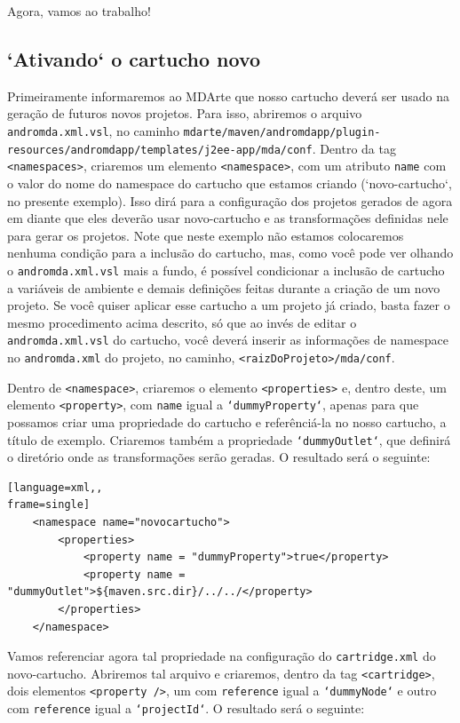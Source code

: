 Agora, vamos ao trabalho!

\subsection{`Ativando` o cartucho novo}
Primeiramente informaremos ao MDArte que nosso cartucho deverá ser usado na
geração de futuros novos projetos. Para isso, abriremos o arquivo
\texttt{andromda.xml.vsl}, no caminho
\texttt{mdarte/maven/andromdapp/plugin-resources/andromdapp/templates/j2ee-app/mda/conf}.
Dentro da tag \texttt{<namespaces>}, criaremos um elemento \texttt{<namespace>},
com um atributo \texttt{name} com o valor do nome do namespace do cartucho que
estamos criando (`novo-cartucho`, no presente exemplo). Isso dirá para a
configuração dos projetos gerados de agora em diante que eles deverão usar
novo-cartucho e as transformações definidas nele para gerar os projetos. Note
que neste exemplo não estamos colocaremos nenhuma condição para a inclusão do
cartucho, mas, como você pode ver olhando o \texttt{andromda.xml.vsl} mais a
fundo, é possível condicionar a inclusão de cartucho a variáveis de ambiente e
demais definições feitas durante a criação de um novo projeto. Se você quiser
aplicar esse cartucho a um projeto já criado, basta fazer o mesmo procedimento
acima descrito, só que ao invés de editar o \texttt{andromda.xml.vsl} do
cartucho, você deverá inserir as informações de namespace no
\texttt{andromda.xml} do projeto, no caminho, \texttt{<raizDoProjeto>/mda/conf}.

Dentro de \texttt{<namespace>}, criaremos o elemento \texttt{<properties>} e,
dentro deste, um elemento \texttt{<property>}, com \texttt{name} igual a
\texttt{`dummyProperty`}, apenas para que possamos criar uma propriedade do
cartucho e referênciá-la no nosso cartucho, a título de exemplo. Criaremos
também a propriedade \texttt{`dummyOutlet`}, que definirá o diretório onde as
transformações serão geradas. O resultado será o seguinte:

 \begin{lstlisting}[language=xml,,
frame=single]
	<namespace name="novocartucho">
	    <properties>
	        <property name = "dummyProperty">true</property>
	        <property name = "dummyOutlet">${maven.src.dir}/../../</property>
	    </properties>
	</namespace>
 \end{lstlisting}
 
 Vamos referenciar agora tal propriedade na configuração do
 \texttt{cartridge.xml} do novo-cartucho. Abriremos tal arquivo e criaremos,
 dentro da tag \texttt{<cartridge>}, dois elementos \texttt{<property />}, um
 com \texttt{reference} igual a \texttt{`dummyNode`} e outro com
 \texttt{reference} igual a \texttt{`projectId`}. O resultado será o seguinte:
 
